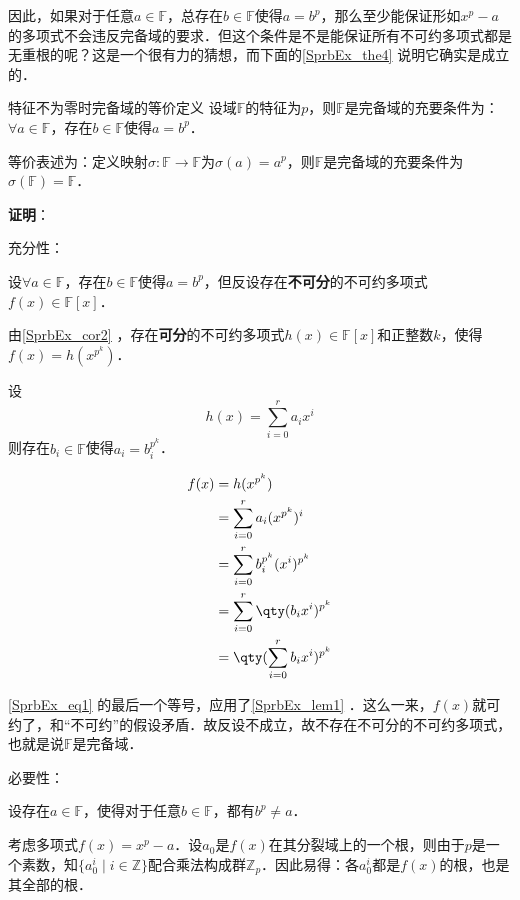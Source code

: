 因此，如果对于任意$a\in\mathbb{F}$，总存在$b\in\mathbb{F}$使得$a=b^p$，那么至少能保证形如$x^p-a$的多项式不会违反完备域的要求．但这个条件是不是能保证所有不可约多项式都是无重根的呢？这是一个很有力的猜想，而下面的\autoref{SprbEx_the4} 说明它确实是成立的．





\begin{theorem}{特征不为零时完备域的等价定义}\label{SprbEx_the4}
设域$\mathbb{F}$的特征为$p$，则$\mathbb{F}$是完备域的充要条件为：$\forall a\in\mathbb{F}$，存在$b\in\mathbb{F}$使得$a=b^p$．

等价表述为：定义映射$\sigma:\mathbb{F}\to\mathbb{F}$为$\sigma(a)=a^p$，则$\mathbb{F}$是完备域的充要条件为$\sigma(\mathbb{F})=\mathbb{F}$．
\end{theorem}

\textbf{证明}：

充分性：

设$\forall a\in\mathbb{F}$，存在$b\in\mathbb{F}$使得$a=b^p$，但反设存在\textbf{不可分}的不可约多项式$f(x)\in\mathbb{F}[x]$．

由\autoref{SprbEx_cor2} ，存在\textbf{可分}的不可约多项式$h(x)\in\mathbb{F}[x]$和正整数$k$，使得$f(x)=h(x^{p^k})$．

设
\begin{equation}
h(x) = \sum_{i=0}^r a_ix^i
\end{equation}
则存在$b_i\in\mathbb{F}$使得$a_i=b_i^{p^k}$．

\begin{equation}\label{SprbEx_eq1}
\begin{aligned}
f(x)&=h(x^{p^k}) \\
&=\sum_{i=0}^r a_i(x^{p^k})^i\\
&=\sum_{i=0}^r b_i^{p^k}(x^{i})^{p^k}\\
&=\sum_{i=0}^r \qty(b_ix^i)^{p^k}\\
&=\qty(\sum_{i=0}^r b_ix^i)^{p^k}
\end{aligned}
\end{equation}

\autoref{SprbEx_eq1} 的最后一个等号，应用了\autoref{SprbEx_lem1} ．这么一来，$f(x)$就可约了，和“不可约”的假设矛盾．故反设不成立，故不存在不可分的不可约多项式，也就是说$\mathbb{F}$是完备域．

必要性：

设存在$a\in\mathbb{F}$，使得对于任意$b\in\mathbb{F}$，都有$b^p\neq a$．

考虑多项式$f(x) = x^p-a$．设$a_0$是$f(x)$在其分裂域上的一个根，则由于$p$是一个素数，知$\{a_0^i\mid i\in\mathbb{Z}\}$配合乘法构成群$\mathbb{Z}_p$．因此易得：各$a_0^i$都是$f(x)$的根，也是其全部的根．

